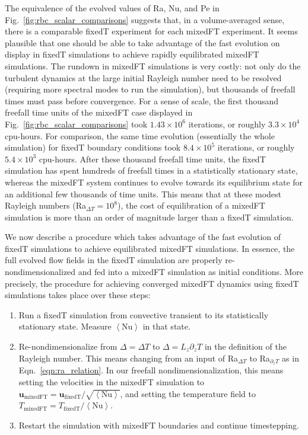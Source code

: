 \documentclass[aps, pre, onecolumn, nofootinbib, notitlepage, groupedaddress, amsfonts, amssymb, amsmath, longbibliography]{revtex4-1}
\newcommand{\angles}[1]{\ensuremath{\left\langle #1 \right\rangle}}
\begin{document}
The equivalence of the evolved values of Ra, Nu, and Pe in Fig.~\ref{fig:rbc_scalar_comparisons} suggests that, in a volume-averaged sense, there is a comparable fixedT experiment for each mixedFT experiment.
It seems plausible that one should be able to take advantage of the fast evolution on display in fixedT simulations to achieve rapidly equilibrated mixedFT simulations.
The rundown in mixedFT simulations is very costly: not only do the turbulent dynamics at the large initial Rayleigh number need to be resolved (requiring more spectral modes to run the simulation), but thousands of freefall times must pass before convergence.
For a sense of scale, the first thousand freefall time units of the mixedFT case displayed in Fig.~\ref{fig:rbc_scalar_comparisons} took $1.43\times10^6$ iterations, or roughly $3.3 \times 10^4$ cpu-hours.
For comparison, the same time evolution (essentially the whole simulation) for fixedT boundary conditions took  $8.4\times10^5$ iterations, or roughly $5.4\times 10^3$ cpu-hours.
After these thousand freefall time units, the fixedT simulation has spent hundreds of freefall times in a statistically stationary state, whereas the mixedFT system continues to evolve towards its equilibrium state for an additional few thousands of time units.
This means that at these modest Rayleigh numbers (Ra$_{\Delta T} = 10^8$), the cost of equilibration of a mixedFT simulation is more than an order of magnitude larger than a fixedT simulation.

We now describe a procedure which takes advantage of the fast evolution of fixedT simulations to achieve equilibrated mixedFT simulations.
In essence, the full evolved flow fields in the fixedT simulation are properly re-nondimensionalized and fed into a mixedFT simulation as initial conditions.
More precisely, the procedure for achieving converged mixedFT dynamics using fixedT simulations takes place over these steps:
\begin{enumerate}
\item Run a fixedT simulation from convective transient to its statistically stationary state. 
Measure $\angles{\text{Nu}}$ in that state.
\item Re-nondimensionalize from $\Delta = \Delta T$ to $\Delta = L_z \partial_z T$ in the definition of the Rayleigh number.
This means changing from an input of Ra$_{\Delta T}$ to Ra$_{\partial_z T}$ as in Eqn.~\ref{eqn:ra_relation}.
In our freefall nondimensionalization, this means setting the velocities in the mixedFT simulation to $\bm{u}_{\text{mixedFT}} = \bm{u}_{\text{fixedT}} / \sqrt{\angles{\text{Nu}}}$, and setting the temperature field to $T_{\text{mixedFT}} = T_{\text{fixedT}} / \angles{\text{Nu}}$.
\item Restart the simulation with mixedFT boundaries and continue timestepping.
\end{enumerate}
\end{document}

